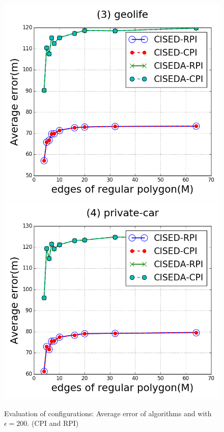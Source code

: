 \begin{figure}[tb!]
\includegraphics[scale = 0.250]{figures/Exp-M-e-200-error-geolife.png}
\includegraphics[scale = 0.250]{figures/Exp-M-e-200-error-private.png}
\vspace{-2ex}
\caption{\small Evaluation of configurations: Average error of algorithms \cist and \cista with $\epsilon = 200$. (CPI and RPI)}
\label{fig:m-error-e200}
\vspace{-1ex}
\end{figure}



